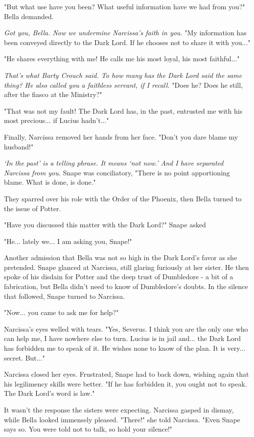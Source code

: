 \documentclass[a4paper,11pt]{article}
\begin{document}
"But what use have you been? What useful information have we had from you?" Bella demanded.

\emph{Got you, Bella. Now we undermine Narcissa's faith in you.} "My information has been conveyed directly to the Dark Lord. If he chooses not to share it with you..."

"He shares everything with me! He calls me his most loyal, his most faithful..."

\emph{That's what Barty Crouch said. To how many has the Dark Lord said the same thing? He also called you a faithless servant, if I recall.} "Does he? Does he still, after the fiasco at the Ministry?"

"That was not my fault! The Dark Lord has, in the past, entrusted me with his most precious... if Lucius hadn't..."

Finally, Narcissa removed her hands from her face. "Don't you dare blame my husband!"

\emph{`In the past' is a telling phrase. It means `not now.' And I have separated Narcissa from you.} Snape was conciliatory, "There is no point apportioning blame. What is done, is done."

They sparred over his role with the Order of the Phoenix, then Bella turned to the issue of Potter.

"Have you discussed this matter with the Dark Lord?" Snape asked

"He... lately we... I am asking you, Snape!"

Another admission that Bella was not so high in the Dark Lord's favor as she pretended. Snape glanced at Narcissa, still glaring furiously at her sister. He then spoke of his disdain for Potter and the deep trust of Dumbledore - a bit of a fabrication, but Bella didn't need to know of Dumbledore's doubts. In the silence that followed, Snape turned to Narcissa.

"Now... you came to ask me for help?"

Narcissa's eyes welled with tears. "Yes, Severus. I think you are the only one who can help me, I have nowhere else to turn. Lucius is in jail and... the Dark Lord has forbidden me to speak of it. He wishes none to know of the plan. It is very... secret. But..."

Narcissa closed her eyes. Frustrated, Snape had to back down, wishing again that his legilimency skills were better. "If he has forbidden it, you ought not to speak. The Dark Lord's word is law."

It wasn't the response the sisters were expecting. Narcissa gasped in dismay, while Bella looked immensely pleased. "There!" she told Narcissa. "Even Snape says so. You were told not to talk, so hold your silence!"
\end{document}
